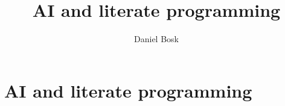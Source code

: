 \documentclass[a4paper,10pt,oneside,openright,
               oldfontcommands]{memoir}
\begin{document}
\title{%
  AI and literate programming
}
\author{Daniel Bosk}

\maketitle

\begin{abstract}
  
\end{abstract}

\clearpage

\tableofcontents*

\chapter{AI and literate programming}



\appendix

{\sloppy}

{\sloppy\printbibliography}
\end{document}
